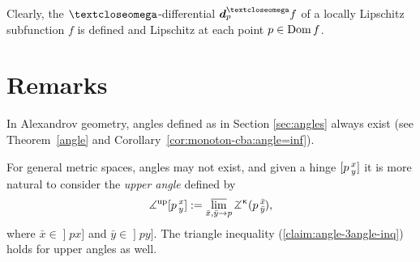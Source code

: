 Clearly, the $\o$-differential $\dd_p^\o f$ of a locally Lipschitz subfunction $f$ is defined and Lipschitz at each point $p\in \Dom f$.


\section{Remarks}
\label{page:upper-angle}
In Alexandrov geometry, angles defined as in Section \ref{sec:angles} always exist (see Theorem~\ref{angle} and Corollary~\ref{cor:monoton-cba:angle=inf}).

For general metric spaces, angles may not exist, 
and given a hinge $[p\,{}^{x}_{y}]$  it is more natural to consider the \emph{upper angle}  defined by
\[\mangle^\text{up}\hinge p x y
\df
\limsup_{\bar x,\bar y\to p} \angk\kappa p{\bar x}{\bar y},\]
where $\bar x\in\mathopen{]}p x]$ and $\bar y\in\mathopen{]}p y]$.
The triangle inequality (\ref{claim:angle-3angle-inq}) holds for upper angles as well.
